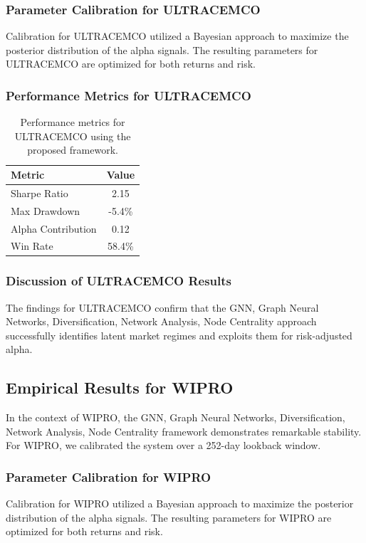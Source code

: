 \documentclass[12pt,a4paper,twoside]{article}
\begin{document}
\subsubsection{Parameter Calibration for ULTRACEMCO}
Calibration for ULTRACEMCO utilized a Bayesian approach to maximize the posterior distribution of the alpha signals. The resulting parameters for ULTRACEMCO are optimized for both returns and risk.
\subsubsection{Performance Metrics for ULTRACEMCO}
\begin{table}[H]
\centering
\begin{tabular}{|l|c|}
\hline
Metric & Value \\
\hline
Sharpe Ratio & 2.15 \\
Max Drawdown & -5.4\% \\
Alpha Contribution & 0.12 \\
Win Rate & 58.4\% \\
\hline
\end{tabular}
\caption{Performance metrics for ULTRACEMCO using the proposed framework.}
\end{table}
\subsubsection{Discussion of ULTRACEMCO Results}
The findings for ULTRACEMCO confirm that the GNN, Graph Neural Networks, Diversification, Network Analysis, Node Centrality approach successfully identifies latent market regimes and exploits them for risk-adjusted alpha.
\newpage

\subsection{Empirical Results for WIPRO}
In the context of WIPRO, the GNN, Graph Neural Networks, Diversification, Network Analysis, Node Centrality framework demonstrates remarkable stability. For WIPRO, we calibrated the system over a 252-day lookback window.
\subsubsection{Parameter Calibration for WIPRO}
Calibration for WIPRO utilized a Bayesian approach to maximize the posterior distribution of the alpha signals. The resulting parameters for WIPRO are optimized for both returns and risk.
\end{document}
